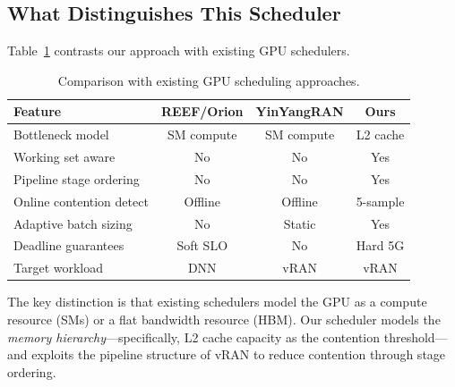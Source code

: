 \subsection{What Distinguishes This Scheduler}

Table~\ref{tab:novelty} contrasts our approach with existing GPU schedulers.

\begin{table}[h]
\centering
\small
\caption{Comparison with existing GPU scheduling approaches.}
\label{tab:novelty}
\begin{tabular}{@{}lccc@{}}
\toprule
Feature & REEF/Orion & YinYangRAN & Ours \\
\midrule
Bottleneck model & SM compute & SM compute & L2 cache \\
Working set aware & No & No & Yes \\
Pipeline stage ordering & No & No & Yes \\
Online contention detect & Offline & Offline & 5-sample \\
Adaptive batch sizing & No & Static & Yes \\
Deadline guarantees & Soft SLO & No & Hard 5G \\
Target workload & DNN & vRAN & vRAN \\
\bottomrule
\end{tabular}
\end{table}

The key distinction is that existing schedulers model the GPU as a compute resource (SMs) or a flat bandwidth resource (HBM). Our scheduler models the \emph{memory hierarchy}---specifically, L2 cache capacity as the contention threshold---and exploits the pipeline structure of vRAN to reduce contention through stage ordering.
